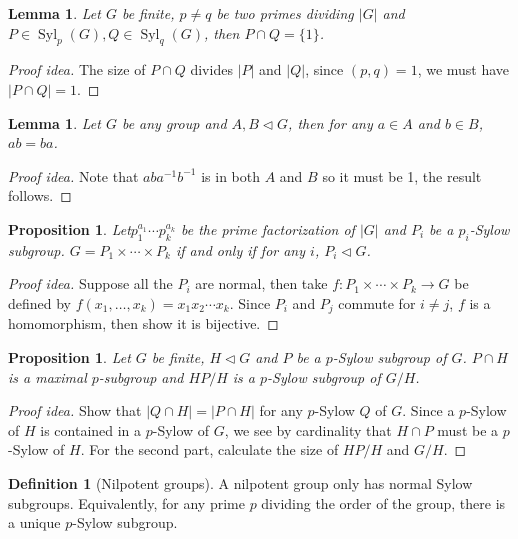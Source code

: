 \documentclass[paper=a4, fontsize=12pt]{scrartcl} %
\newtheorem{prop}[thm]{Proposition}
\newtheorem{lem}[thm]{Lemma}
\theoremstyle{definition}
\newtheorem{defn}[thm]{Definition}
\theoremstyle{remark}
\DeclareMathOperator{\syl}{Syl}
\numberwithin{equation}{section} %
\numberwithin{figure}{section} %
\numberwithin{table}{section} %
\begin{document}
\begin{lem}
	Let $G$ be finite, $p \neq q$ be two primes dividing $|G|$ and $P \in \syl_p(G), Q \in \syl_q(G)$, then $P \cap Q = \{1\}$.
\end{lem}
\begin{proof}[Proof idea]
	The size of $P \cap Q$ divides $|P|$ and $|Q|$, since $(p,q) = 1$, we must have $|P \cap Q| = 1$.
\end{proof}
\begin{lem}
	Let $G$ be any group and $A,B \lhd G$, then for any $a \in A$ and $b \in B$, $ab = ba$.
\end{lem}
\begin{proof}[Proof idea]
	Note that $aba^{-1}b^{-1}$ is in both $A$ and $B$ so it must be 1, the result follows.
\end{proof}
\begin{prop}
	Let$p_1^{a_1}\cdots p_k^{a_k}$ be the prime factorization of $|G|$ and $P_i$ be a $p_i$-Sylow subgroup. $G = P_1 \times \cdots \times P_k$ if and only if for any $i$, $P_i \lhd G$.
\end{prop}
\begin{proof}[Proof idea]
	Suppose all the $P_i$ are normal, then take $f: P_1 \times \cdots \times P_k \rightarrow G$ be defined by $f(x_1, \dots, x_k) = x_1x_2\cdots x_k$. Since $P_i$ and $P_j$ commute for $i\neq j$, $f$ is a homomorphism, then show it is bijective.
\end{proof}
\begin{prop}
	Let $G$ be finite, $H \lhd G$ and $P$ be a $p$-Sylow subgroup of $G$. $P \cap H$ is a maximal $p$-subgroup and $HP/H$ is a $p$-Sylow subgroup of $G/H$.
\end{prop}
\begin{proof}[Proof idea]
	Show that $|Q \cap H| = |P \cap H|$ for any $p$-Sylow $Q$ of $G$. Since a $p$-Sylow of $H$ is contained in a $p$-Sylow of $G$, we see by cardinality that $H\cap P$ must be a $p$-Sylow of $H$. For the second part, calculate the size of $HP/H$ and $G/H$. 
\end{proof}
\begin{defn}[Nilpotent groups]
	A nilpotent group only has normal Sylow subgroups. Equivalently, for any prime $p$ dividing the order of the group, there is a unique $p$-Sylow subgroup.
\end{defn}
\end{document}
